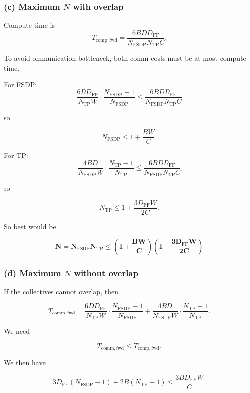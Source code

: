 \documentclass[11pt]{article}
\begin{document}
\vspace{4em}

\subsubsection*{(c) Maximum $N$ with overlap}

Compute time is
\[
T_{\mathrm{comp,fwd}}
=
\frac{6 B D D_{\mathrm{FF}}}
{N_{\mathrm{FSDP}} N_{\mathrm{TP}} C}.
\]

To avoid ommunication bottleneck, both comm costs must be at most compute time.

For FSDP:
\[
\frac{6 D D_{\mathrm{FF}}}{N_{\mathrm{TP}} W}
\cdot
\frac{N_{\mathrm{FSDP}} - 1}{N_{\mathrm{FSDP}}}
\le
\frac{6 B D D_{\mathrm{FF}}}
{N_{\mathrm{FSDP}} N_{\mathrm{TP}} C}
\]

so

\[
N_{\mathrm{FSDP}}
\le
1 + \frac{B W}{C}.
\]

For TP:
\[
\frac{4 B D}{N_{\mathrm{FSDP}} W}
\cdot
\frac{N_{\mathrm{TP}} - 1}{N_{\mathrm{TP}}}
\le
\frac{6 B D D_{\mathrm{FF}}}
{N_{\mathrm{FSDP}} N_{\mathrm{TP}} C}
\]

so

\[
N_{\mathrm{TP}}
\le
1 + \frac{3 D_{\mathrm{FF}} W}{2C}.
\]

So best would be

\[
\mathbf{
N
=
N_{\mathrm{FSDP}} N_{\mathrm{TP}}
\le
\left(1 + \frac{B W}{C}\right)
\left(1 + \frac{3 D_{\mathrm{FF}} W}{2C}\right)
}
\]

\vspace{4em}

\subsubsection*{(d) Maximum $N$ without overlap}

If the collectives cannot overlap, then

\[
T_{\mathrm{comm,fwd}}
=
\frac{6 D D_{\mathrm{FF}}}{N_{\mathrm{TP}} W}
\cdot
\frac{N_{\mathrm{FSDP}} - 1}{N_{\mathrm{FSDP}}}
+
\frac{4 B D}{N_{\mathrm{FSDP}} W}
\cdot
\frac{N_{\mathrm{TP}} - 1}{N_{\mathrm{TP}}}.
\]

We need

\[
T_{\mathrm{comm,fwd}}
\le
T_{\mathrm{comp,fwd}}.
\]

We then have

\[
3D_{\mathrm{FF}}(N_{\mathrm{FSDP}} - 1)
+
2B(N_{\mathrm{TP}} - 1)
\le
\frac{3 B D_{\mathrm{FF}} W}{C}.
\]
\end{document}
